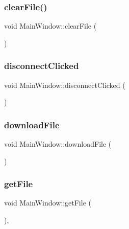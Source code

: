 \subsubsection{\texorpdfstring{clear\+File()}{clearFile()}}
{\footnotesize\ttfamily void Main\+Window\+::clear\+File (\begin{DoxyParamCaption}{ }\end{DoxyParamCaption})}

\mbox{\label{class_main_window_a18ba5e9b20b321fec60894796e053ca5}} 
\subsubsection{\texorpdfstring{disconnect\+Clicked}{disconnectClicked}}
{\footnotesize\ttfamily void Main\+Window\+::disconnect\+Clicked (\begin{DoxyParamCaption}{ }\end{DoxyParamCaption})\hspace{0.3cm}{\ttfamily [signal]}}

\mbox{\label{class_main_window_af8f815f498b3ecec7c8e19dfbc8b6c47}} 
\subsubsection{\texorpdfstring{download\+File}{downloadFile}}
{\footnotesize\ttfamily void Main\+Window\+::download\+File (\begin{DoxyParamCaption}{ }\end{DoxyParamCaption})\hspace{0.3cm}{\ttfamily [signal]}}

\mbox{\label{class_main_window_ae312fe1c0640df073ef40d7fbab3e1f9}} 
\subsubsection{\texorpdfstring{get\+File}{getFile}}
{\footnotesize\ttfamily void Main\+Window\+::get\+File (\begin{DoxyParamCaption}{ }\end{DoxyParamCaption})\hspace{0.3cm}{\ttfamily [private]}, {\ttfamily [slot]}}

